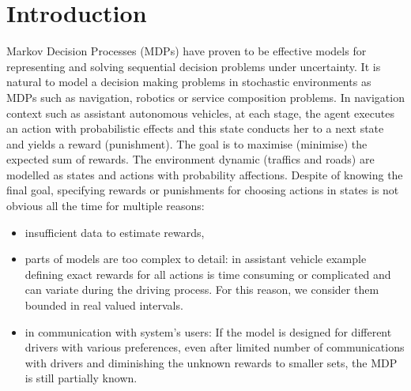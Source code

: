 \documentclass[runningheads,a4paper]{llncs}
\begin{document}
\section{Introduction}


Markov Decision Processes (MDPs) have proven to be effective models for representing and solving sequential decision problems under uncertainty. It is natural to model a decision making problems in stochastic environments as MDPs such as navigation, robotics or service composition problems. In navigation context such as assistant autonomous vehicles, at each stage, the agent executes an action with probabilistic effects and this state conducts her to a next state and yields a reward (punishment). The goal is to maximise (minimise) the expected sum of rewards. The environment dynamic (traffics and roads) are modelled as states and actions with probability affections. Despite of knowing the final goal, specifying rewards or punishments for choosing actions in states is not obvious all the time %
for multiple reasons:
\begin{itemize}
\item insufficient data to estimate rewards,
\item parts of models are too complex to detail: in assistant vehicle example defining exact rewards for all actions is time consuming or complicated and can variate during the driving process. For this reason, we consider them bounded in real valued intervals.
\item in communication with system's users: If the model is designed for different drivers with various preferences, even after limited number of communications with drivers and diminishing the unknown rewards to smaller sets, the MDP is still partially known. 
\end{itemize}
\end{document}
